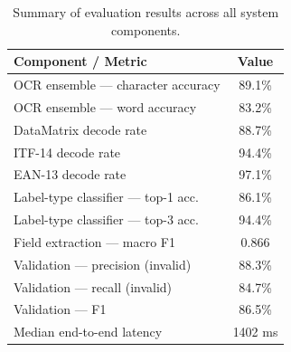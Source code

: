 \begin{table}[h]
\centering
\caption{Summary of evaluation results across all system components.}
\label{tab:summary}
\begin{tabular}{lc}
\toprule
\textbf{Component / Metric} & \textbf{Value} \\
\midrule
OCR ensemble — character accuracy   & 89.1\% \\
OCR ensemble — word accuracy        & 83.2\% \\
DataMatrix decode rate              & 88.7\% \\
ITF-14 decode rate                  & 94.4\% \\
EAN-13 decode rate                  & 97.1\% \\
Label-type classifier — top-1 acc.  & 86.1\% \\
Label-type classifier — top-3 acc.  & 94.4\% \\
Field extraction — macro F1         & 0.866 \\
Validation — precision (invalid)    & 88.3\% \\
Validation — recall (invalid)       & 84.7\% \\
Validation — F1                     & 86.5\% \\
Median end-to-end latency           & 1402 ms \\
\bottomrule
\end{tabular}
\end{table}
